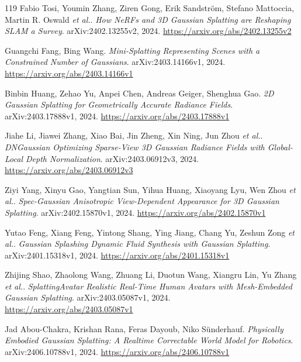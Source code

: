 \documentclass[11pt,a4paper]{article}
\begin{document}
\begin{thebibliography}{119}
Fabio Tosi, Youmin Zhang, Ziren Gong, Erik Sandstr\"{o}m, Stefano Mattoccia, Martin R. Oswald \emph{et al.}.
\newblock \emph{How NeRFs and 3D Gaussian Splatting are Reshaping SLAM a Survey}.
\newblock arXiv:2402.13255v2, 2024.
\newblock \url{https://arxiv.org/abs/2402.13255v2}

Guangchi Fang, Bing Wang.
\newblock \emph{Mini-Splatting Representing Scenes with a Constrained Number of Gaussians}.
\newblock arXiv:2403.14166v1, 2024.
\newblock \url{https://arxiv.org/abs/2403.14166v1}

Binbin Huang, Zehao Yu, Anpei Chen, Andreas Geiger, Shenghua Gao.
\newblock \emph{2D Gaussian Splatting for Geometrically Accurate Radiance Fields}.
\newblock arXiv:2403.17888v1, 2024.
\newblock \url{https://arxiv.org/abs/2403.17888v1}

Jiahe Li, Jiawei Zhang, Xiao Bai, Jin Zheng, Xin Ning, Jun Zhou \emph{et al.}.
\newblock \emph{DNGaussian Optimizing Sparse-View 3D Gaussian Radiance Fields with Global-Local Depth Normalization}.
\newblock arXiv:2403.06912v3, 2024.
\newblock \url{https://arxiv.org/abs/2403.06912v3}

Ziyi Yang, Xinyu Gao, Yangtian Sun, Yihua Huang, Xiaoyang Lyu, Wen Zhou \emph{et al.}.
\newblock \emph{Spec-Gaussian Anisotropic View-Dependent Appearance for 3D Gaussian Splatting}.
\newblock arXiv:2402.15870v1, 2024.
\newblock \url{https://arxiv.org/abs/2402.15870v1}

Yutao Feng, Xiang Feng, Yintong Shang, Ying Jiang, Chang Yu, Zeshun Zong \emph{et al.}.
\newblock \emph{Gaussian Splashing Dynamic Fluid Synthesis with Gaussian Splatting}.
\newblock arXiv:2401.15318v1, 2024.
\newblock \url{https://arxiv.org/abs/2401.15318v1}

Zhijing Shao, Zhaolong Wang, Zhuang Li, Duotun Wang, Xiangru Lin, Yu Zhang \emph{et al.}.
\newblock \emph{SplattingAvatar Realistic Real-Time Human Avatars with Mesh-Embedded Gaussian Splatting}.
\newblock arXiv:2403.05087v1, 2024.
\newblock \url{https://arxiv.org/abs/2403.05087v1}

Jad Abou-Chakra, Krishan Rana, Feras Dayoub, Niko S\"{u}nderhauf.
\newblock \emph{Physically Embodied Gaussian Splatting: A Realtime Correctable World Model for Robotics}.
\newblock arXiv:2406.10788v1, 2024.
\newblock \url{https://arxiv.org/abs/2406.10788v1}


\end{thebibliography}
\end{document}
